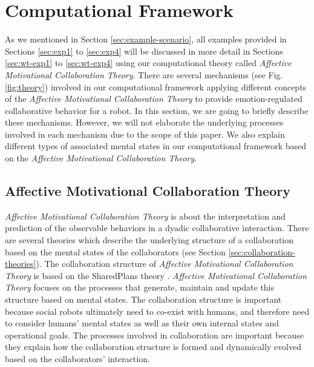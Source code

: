 \section{Computational Framework}
\label{sec:computational-framework}

As we mentioned in Section \ref{sec:example-scenario}, all examples provided in
Sections \ref{sec:exp1} to \ref{sec:exp4} will be discussed in more detail in
Sections \ref{sec:wt-exp1} to \ref{sec:wt-exp4} using our computational theory
called \textit{Affective Motivational Collaboration Theory}. There are several
mechanisms (see Fig. \ref{fig:theory}) involved in our computational framework
applying different concepts of the \textit{Affective Motivational Collaboration
Theory} to provide emotion-regulated collaborative behavior for a robot. In this
section, we are going to briefly describe these mechanisms. However, we will not
elaborate the underlying processes involved in each mechanism due to the scope
of this paper. We also explain different types of associated mental states in
our computational framework based on the \textit{Affective Motivational
Collaboration Theory}.

\subsection{Affective Motivational Collaboration Theory}
\label{sec:AMCT}

\textit{Affective Motivational Collaboration Theory} is about the interpretation
and prediction of the observable behaviors in a dyadic collaborative
interaction. There are several theories which describe the underlying structure
of a collaboration based on the mental states of the collaborators (see Section
\ref{sec:collaboration-theories}). The collaboration structure of
\textit{Affective Motivational Collaboration Theory} is based on the SharedPlans
theory \cite{grosz:planning-acting,grosz:collaboration,grosz:plans-discourse}.
\textit{Affective Motivational Collaboration Theory} focuses on the processes
that generate, maintain and update this structure based on mental states. The
collaboration structure is important because social robots ultimately need to
co-exist with humans, and therefore need to consider humans' mental states as
well as their own internal states and operational goals. The processes involved
in collaboration are important because they explain how the collaboration
structure is formed and dynamically evolved based on the collaborators'
interaction.

